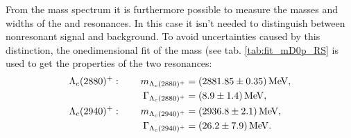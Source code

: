 From the \Dz\proton mass spectrum it is furthermore possible to measure the masses and widths of the \LcResI and \LcResII resonances. In this case it isn't needed to distinguish between nonresonant signal and background. 
To avoid uncertainties caused by this distinction, the onedimensional fit of the \Dz\proton mass (see tab. \ref{tab:fit_mD0p_RS} is used to get the properties of the two resonances:
\begin{align*}
    {\ensuremath{\Lambda}}_{c}(2880)^+: \qquad  m_{{\Lambda}_{c}(2880)^+}       &= (2881.85 \pm 0.35) \mathrm{\,Me\kern -0.1em V}, \\
                     \Gamma_{{\Lambda}_{c}(2880)^+}  &= (8.9 \pm 1.4) \mathrm{\,Me\kern -0.1em V}, \\
    {\Lambda}_{c}(2940)^+: \qquad m_{{\Lambda}_{c}(2940)^+}      &= (2936.8 \pm 2.1) \mathrm{\,Me\kern -0.1em V}, \\
                     \Gamma_{{\Lambda}_{c}(2940)^+} &= (26.2 \pm 7.9) \mathrm{\,Me\kern -0.1em V}. \\
\end{align*}
